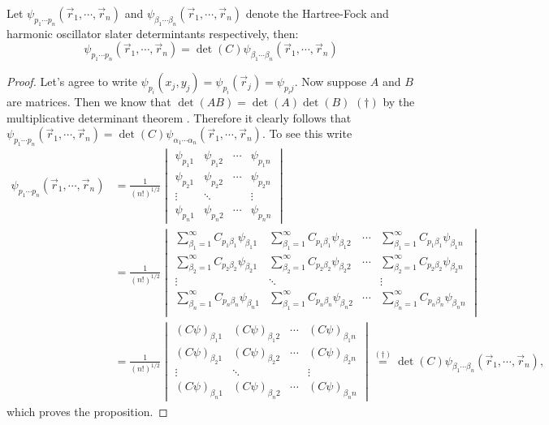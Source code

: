 \documentclass[11pt,english,a4paper]{article}
\begin{document}
\begin{prop}
Let $\psi_{  p_1\cdots p_n}(\vec{r}_1,\cdots, \vec{r}_n)$ and $\psi_{  \beta_1\cdots \beta_n}(\vec{r}_1,\cdots, \vec{r}_n)$ denote the Hartree-Fock and harmonic oscillator slater determintants respectively, then:
\[
\psi_{  p_1\cdots p_n}(\vec{r}_1,\cdots, \vec{r}_n) = \det (C) \psi_{  \beta_1\cdots \beta_n}(\vec{r}_1,\cdots, \vec{r}_n) 
\] \label{prop:slater}
\end{prop}
\begin{proof}
Let's agree to write $\psi_{p_i}(x_j,y_j) = \psi_{p_i}(\vec{r}_j) = \psi_{  p_ij}$. Now suppose $A$ and $B$ are matrices. Then we know that $\det(AB) = \det(A)\det(B)$ $(\dagger)$ by the multiplicative determinant theorem \parencite[173]{lay_linear_2012}. Therefore it clearly follows that $\psi_{  p_1\cdots p_n}(\vec{r}_1,\cdots, \vec{r}_n) = \det(C)\psi_{  \alpha_1\cdots \alpha_n}(\vec{r}_1,\cdots, \vec{r}_n)$. To see this write
\begin{align*}
\psi_{  p_1\cdots p_n}(\vec{r}_1,\cdots, \vec{r}_n) &=  \frac{1}{(n!)^{1/2}}
\begin{vmatrix}
\psi_{  p_1 1} & \psi_{  p_1 2} & \cdots & \psi_{  p_1 n}\\
\psi_{  p_2 1} & \psi_{  p_2 2} & \cdots & \psi_{  p_2 n}\\
\vdots & \ddots && \vdots\\
\psi_{  p_n 1} & \psi_{  p_n 2} & \cdots & \psi_{  p_n n}
\end{vmatrix}\\
&=
\frac{1}{(n!)^{1/2}}\begin{vmatrix}
\sum_{  \beta_1=1}^\infty C_{  p_1\beta_1}\psi_{  \beta_1 1} & \sum_{  \beta_1=1}^\infty C_{  p_1\beta_1}\psi_{  \beta_1 2} & \cdots & \sum_{  \beta_1=1}^\infty C_{  p_1\beta_1}\psi_{  \beta_1 n}\\
\sum_{  \beta_2=1}^\infty C_{  p_2\beta_2}\psi_{  \beta_2 1} & \sum_{  \beta_2=1}^\infty C_{  p_2\beta_2}\psi_{  \beta_2 2} & \cdots & \sum_{  \beta_2=1}^\infty C_{  p_2\beta_2}\psi_{  \beta_2 n}\\
\vdots & \ddots && \vdots\\
\sum_{  \beta_n=1}^\infty C_{  p_n\beta_n}\psi_{  \beta_n 1} & \sum_{  \beta_1=1}^\infty C_{  p_n\beta_n}\psi_{  \beta_n 2} & \cdots & \sum_{  \beta_n=1}^\infty C_{  p_n\beta_n}\psi_{  \beta_n n}\\
\end{vmatrix}\\
&=
\frac{1}{(n!)^{1/2}}\begin{vmatrix}
(C \psi)_{  \beta_1 1} & (C \psi)_{  \beta_1 2} & \cdots & (C \psi)_{  \beta_1 n}\\
(C \psi)_{  \beta_2 1} & (C \psi)_{  \beta_2 2} & \cdots & (C \psi)_{  \beta_2 n}\\
\vdots & \ddots && \vdots\\
(C \psi)_{  \beta_n 1} & (C \psi)_{  \beta_n 2} & \cdots & (C \psi)_{  \beta_n n}
\end{vmatrix} \stackrel{(\dagger)}{=} \det(C)\psi_{  \beta_1\cdots \beta_n}(\vec{r}_1,\cdots, \vec{r}_n),
\end{align*}
which proves the proposition. 
\end{proof}
\end{document}
